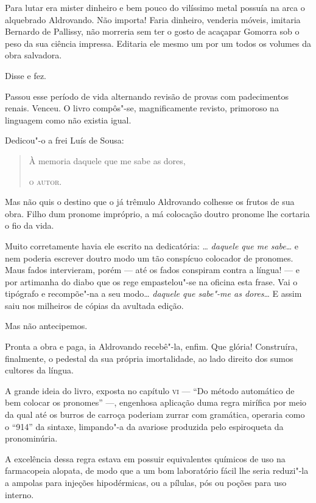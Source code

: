 Para lutar era mister dinheiro e bem pouco do vilíssimo metal possuía na
arca o alquebrado Aldrovando. Não importa! Faria dinheiro, venderia
móveis, imitaria Bernardo de Pallissy, não morreria sem ter o gosto de
acaçapar Gomorra sob o peso da sua ciência impressa. Editaria ele mesmo
um por um todos os volumes da obra salvadora.

Disse e fez.

Passou esse período de vida alternando revisão de provas com
padecimentos renais. Venceu. O livro compôs"-se, magnificamente revisto,
primoroso na linguagem como não existia igual.

Dedicou"-o a frei Luís de Sousa:

\begin{quote}
À memoria daquele que me sabe as dores,

\textsc{o autor.}
\end{quote}

Mas não quis o destino que o já trêmulo Aldrovando colhesse os frutos de
sua obra. Filho dum pronome impróprio, a má colocação doutro pronome lhe
cortaria o fio da vida.

Muito corretamente havia ele escrito na dedicatória: \ldots{} \emph{daquele
que me sabe}\ldots{} e nem poderia escrever doutro modo um tão conspícuo
colocador de pronomes. Maus fados intervieram, porém --- até os fados
conspiram contra a língua! --- e por artimanha do diabo que os rege
empastelou"-se na oficina esta frase. Vai o tipógrafo e recompõe"-na a seu
modo\ldots{} \emph{daquele que sabe"-me as dores}\ldots{} E assim saiu nos
milheiros de cópias da avultada edição.

Mas não antecipemos.

Pronta a obra e paga, ia Aldrovando recebê"-la, enfim. Que glória!
Construíra, finalmente, o pedestal da sua própria imortalidade, ao lado
direito dos sumos cultores da língua.

A grande ideia do livro, exposta no capítulo \textsc{vi} --- ``Do método
automático de bem colocar os pronomes'' ---, engenhosa aplicação duma
regra mirífica por meio da qual até os burros de carroça poderiam zurrar
com gramática, operaria como o ``914'' da sintaxe, limpando"-a da
avariose produzida pelo espiroqueta da pronominúria.

A excelência dessa regra estava em possuir equivalentes químicos de uso
na farmacopeia alopata, de modo que a um bom laboratório fácil lhe seria
reduzi"-la a ampolas para injeções hipodérmicas, ou a pílulas, pós ou
poções para uso interno.

